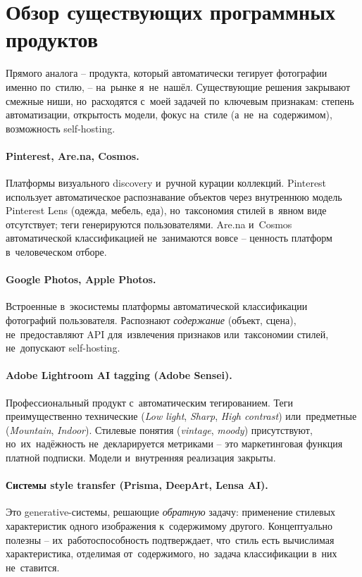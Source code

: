 \documentclass[a4paper,12pt]{diplom}
\begin{document}
\section{Обзор существующих программных продуктов}
\label{sec:competitors}

Прямого аналога -- продукта, который автоматически тегирует фотографии именно по~стилю, -- на~рынке я~не~нашёл. Существующие решения закрывают смежные ниши, но~расходятся с~моей задачей по~ключевым признакам: степень автоматизации, открытость модели, фокус на~стиле (а~не~на~содержимом), возможность self-hosting.

\paragraph{Pinterest, Are.na, Cosmos.} Платформы визуального discovery и~ручной курации коллекций. Pinterest использует автоматическое распознавание объектов через внутреннюю модель Pinterest Lens (одежда, мебель, еда), но~таксономия стилей в~явном виде отсутствует; теги генерируются пользователями. Are.na и~Cosmos автоматической классификацией не~занимаются вовсе -- ценность платформ в~человеческом отборе.

\paragraph{Google Photos, Apple Photos.} Встроенные в~экосистемы платформы автоматической классификации фотографий пользователя. Распознают \emph{содержание} (объект, сцена), не~предоставляют API для~извлечения признаков или~таксономии стилей, не~допускают self-hosting.

\paragraph{Adobe Lightroom AI tagging (Adobe Sensei).} Профессиональный продукт с~автоматическим тегированием. Теги преимущественно технические (\emph{Low light}, \emph{Sharp}, \emph{High contrast}) или~предметные (\emph{Mountain}, \emph{Indoor}). Стилевые понятия (\emph{vintage}, \emph{moody}) присутствуют, но~их~надёжность не~декларируется метриками -- это маркетинговая функция платной подписки. Модели и~внутренняя реализация закрыты.

\paragraph{Системы style transfer (Prisma, DeepArt, Lensa AI).} Это generative-системы, решающие \emph{обратную} задачу: применение стилевых характеристик одного изображения к~содержимому другого. Концептуально полезны -- их~работоспособность подтверждает, что~стиль есть вычислимая характеристика, отделимая от~содержимого, но~задача классификации в~них не~ставится.
\end{document}
